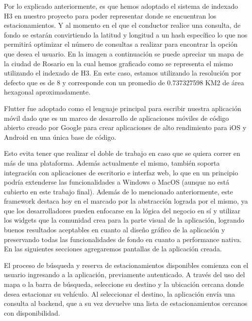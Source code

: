 Por lo explicado anteriormente, es que hemos adoptado el sistema de indexado H3 en nuestro proyecto para poder representar donde se encuentran los estacionamientos. Y al momento en el que el conductor realice una consulta, de fondo se estarán convirtiendo la latitud y longitud a un hash específico lo que nos permitirá optimizar el número de consultas a realizar para encontrar la opción que desea el usuario. En la imagen a continuación se puede apreciar un mapa de la ciudad de Rosario en la cual hemos graficado como se representa el mismo utilizando el indexado de H3. En este caso, estamos utilizando la resolución por defecto que es de 8 y corresponde con un promedio de 0.737327598 KM2 de área hexagonal aproximadamente.


Flutter fue adoptado como el lenguaje principal para escribir nuestra aplicación móvil dado que es un marco de desarrollo de aplicaciones móviles de código abierto creado por Google para crear aplicaciones de alto rendimiento para iOS y Android en una única base de código. 

Esto evita tener que realizar el doble de trabajo en caso que se quiera correr en más de una plataforma. Además actualmente el mismo, también soporta integración con aplicaciones de escritorio e interfaz web, lo que en un principio podría extenderse las funcionalidades a Windows o MacOS (aunque no está cubierto en este trabajo final). Además de lo mencionado anteriormente, este framework destaca hoy en el marcado por la abstracción lograda por el mismo, ya que los desarrolladores pueden enfocarse en la lógica del negocio en sí y utilizar los widgets que la comunidad crea para la parte visual de la aplicación, logrando buenos resultados aceptables en cuanto al diseño gráfico de la aplicación y preservando todas las funcionalidades de fondo en cuanto a performance nativa. En las siguientes secciones agregaremos pantallas de la aplicación creada.

El proceso de búsqueda y reserva de estacionamientos disponibles comienza con el usuario ingresando a la aplicación, previamente autenticado. A través del uso del mapa o la barra de búsqueda, seleccione su destino y la ubicación cercana donde desea estacionar su vehículo. Al seleccionar el destino, la aplicación envía una consulta al backend, que a su vez devuelve una lista de estacionamientos cercanos con disponibilidad.

